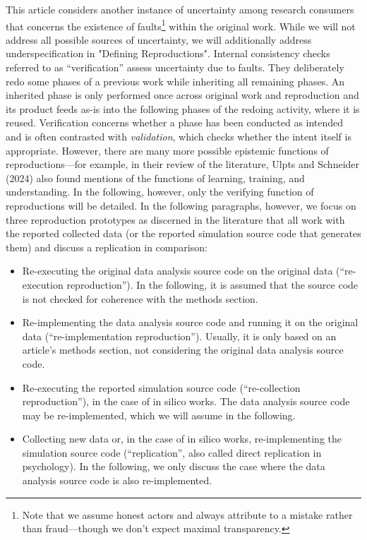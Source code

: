 \documentclass[authordate, meta]{jote-new-article}
\begin{document}
	This article considers another instance of uncertainty among research consumers that concerns the existence of faults\footnote{ Note that we assume honest actors and always attribute to a mistake rather than fraud---though we don't expect maximal transparency.} within the original work. While we will not address all possible sources of uncertainty, we will additionally address underspecification in "Defining Reproductions". Internal consistency checks referred to as “verification” assess uncertainty due to faults. They deliberately redo some phases of a previous work while inheriting all remaining phases. An inherited phase is only performed once across original work and reproduction and its product feeds as-is into the following phases of the redoing activity, where it is reused. Verification concerns whether a phase has been conducted as intended and is often contrasted with \emph{validation}, which checks whether the intent itself is appropriate. However, there are many more possible epistemic functions of reproductions—for example, in their review of the literature, Ulpts and Schneider (2024) also found mentions of the functions of learning, training, and understanding. In the following, however, only the verifying function of reproductions will be detailed. In the following paragraphs, however, we focus on three reproduction prototypes as discerned in the literature that all work with the reported collected data (or the reported simulation source code that generates them) and discuss a replication in comparison:

	\begin{itemize}


		\item Re-executing the original data analysis source code on the original data (“re-execution reproduction”). In the following, it is assumed that the source code is not checked for coherence with the methods section.



		\item
		Re-implementing the data analysis source code and running it on the original data (“re-implementation reproduction”). Usually, it is only based on an article's methods section, not considering the original data analysis source code.



		\item Re-executing the reported simulation source code (“re-collection reproduction”), in the case of in silico works. The data analysis source code may be re-implemented, which we will assume in the following.



		\item Collecting new data or, in the case of in silico works, re-implementing the simulation source code (“replication”, also called direct replication in psychology). In the following, we only discuss the case where the data analysis source code is also re-implemented.


	\end{itemize}
\end{document}
